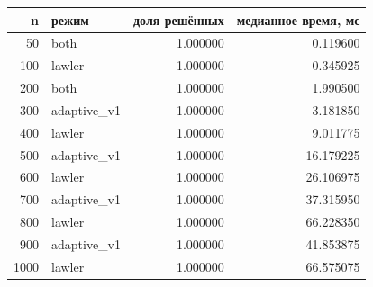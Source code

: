 \begin{tabular}{rlrr}
\toprule
n & режим & доля решённых & медианное время, мс \\
\midrule
50 & both & 1.000000 & 0.119600 \\
100 & lawler & 1.000000 & 0.345925 \\
200 & both & 1.000000 & 1.990500 \\
300 & adaptive\_v1 & 1.000000 & 3.181850 \\
400 & lawler & 1.000000 & 9.011775 \\
500 & adaptive\_v1 & 1.000000 & 16.179225 \\
600 & lawler & 1.000000 & 26.106975 \\
700 & adaptive\_v1 & 1.000000 & 37.315950 \\
800 & lawler & 1.000000 & 66.228350 \\
900 & adaptive\_v1 & 1.000000 & 41.853875 \\
1000 & lawler & 1.000000 & 66.575075 \\
\bottomrule
\end{tabular}
